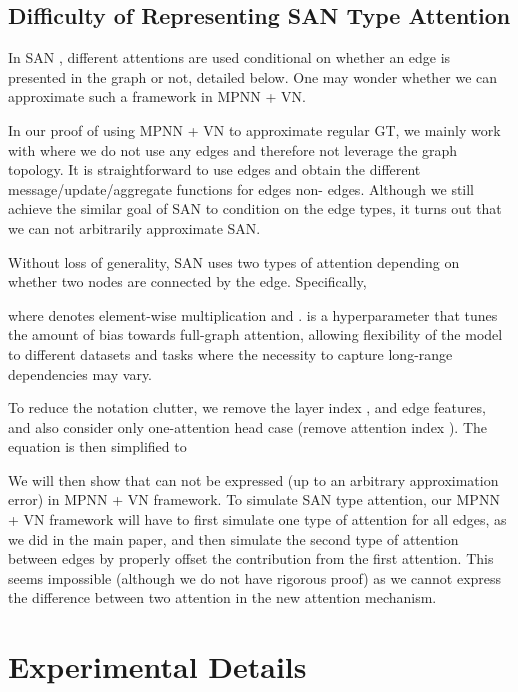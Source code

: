 \documentclass[nohyperref]{article}
\theoremstyle{plain}
\theoremstyle{definition}
\theoremstyle{remark}
\newcommand{\gngn}{\text{gn-gn}}
\begin{document}
\subsection{Difficulty of Representing SAN Type Attention}
In SAN \citep{kreuzer2021rethinking}, different attentions are used conditional on whether an edge is presented in the graph or not, detailed below. One may wonder whether we can approximate such a framework in MPNN + VN. 

In our proof of using MPNN + VN to approximate regular GT, we mainly work with  where we do not use any \gngn{}   edges and therefore not leverage the graph topology. It is straightforward to use \gngn{} edges and obtain the different message/update/aggregate functions for \gngn{} edges non-\gngn{} edges. Although we still achieve the similar goal of SAN to condition on the edge types, it turns out that we can not arbitrarily approximate SAN. 

Without loss of generality, SAN uses two types of attention depending on whether two nodes are connected by the edge. Specifically, 

where  denotes element-wise multiplication and  . is a hyperparameter that tunes the amount of bias towards full-graph attention, allowing flexibility of the model to different datasets and tasks where the necessity to capture long-range dependencies may vary. 

To reduce the notation clutter, we remove the layer index , and edge features, and also consider only one-attention head case (remove attention index ). The equation is then simplified to

We will then show that  can not be expressed (up to an arbitrary approximation error) in MPNN + VN framework. To simulate SAN type attention, our MPNN + VN framework will have to first simulate one type of attention for all edges, as we did in the main paper, and then simulate the second type of attention between \gngn{} edges by properly offset the contribution from the first attention. This seems impossible (although we do not have rigorous proof) as we cannot express the difference between two attention in the new attention mechanism.









\section{Experimental Details}
\end{document}
